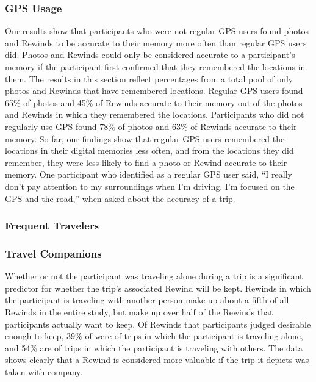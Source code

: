 \documentclass{sigchi}
\begin{document}
\subsubsection{GPS Usage}
Our results show that participants who were not regular GPS users found photos and Rewinds to be accurate to their memory more often than regular GPS users did. Photos and Rewinds could only be considered accurate to a participant's memory if the participant first confirmed that they remembered the locations in them. The results in this section reflect percentages from a total pool of only photos and Rewinds that have remembered locations. Regular GPS users found 65\% of photos and 45\% of Rewinds accurate to their memory out of the photos and Rewinds in which they remembered the locations. Participants who did not regularly use GPS found 78\% of photos and 63\% of Rewinds accurate to their memory. So far, our findings show that regular GPS users remembered the locations in their digital memories less often, and from the locations they did remember, they were less likely to find a photo or Rewind accurate to their memory. One participant who identified as a regular GPS user said, ``I really don't pay attention to my surroundings when I'm driving. I'm focused on the GPS and the road,'' when asked about the accuracy of a trip.


\subsubsection{Frequent Travelers}



\subsubsection{Travel Companions}
Whether or not the participant was traveling alone during a trip is a significant predictor for whether the trip's associated Rewind will be kept. Rewinds in which the participant is traveling with another person make up about a fifth of all Rewinds in the entire study, but make up over half of the Rewinds that participants actually want to keep. Of Rewinds that participants judged desirable enough to keep, 39\% of were of trips in which the participant is traveling alone, and 54\% are of trips in which the participant is traveling with others. The data shows clearly that a Rewind is considered more valuable if the trip it depicts was taken with company. 
\end{document}
